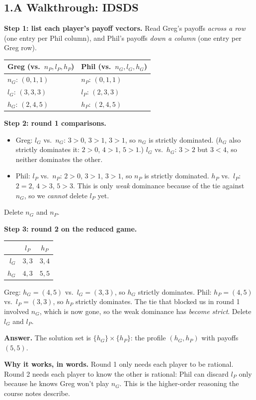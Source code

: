 \documentclass[11pt]{article}
\begin{document}
\subsection*{1.A Walkthrough: IDSDS}
\textbf{Step 1: list each player's payoff vectors.} Read Greg's payoffs \emph{across a row} (one entry per Phil column), and Phil's payoffs \emph{down a column} (one entry per Greg row).
\begin{center}
\begin{tabular}{l|l}
Greg (vs.\ $n_P,l_P,h_P$) & Phil (vs.\ $n_G,l_G,h_G$) \\ \hline
$n_G$: $(0,1,1)$ & $n_P$: $(0,1,1)$ \\
$l_G$: $(3,3,3)$ & $l_P$: $(2,3,3)$ \\
$h_G$: $(2,4,5)$ & $h_P$: $(2,4,5)$
\end{tabular}
\end{center}

\textbf{Step 2: round 1 comparisons.}
\begin{itemize}
\item Greg: $l_G$ vs.\ $n_G$: $3>0$, $3>1$, $3>1$, so $n_G$ is strictly dominated. ($h_G$ also strictly dominates it: $2>0$, $4>1$, $5>1$.) $l_G$ vs.\ $h_G$: $3>2$ but $3<4$, so neither dominates the other.
\item Phil: $l_P$ vs.\ $n_P$: $2>0$, $3>1$, $3>1$, so $n_P$ is strictly dominated. $h_P$ vs.\ $l_P$: $2=2$, $4>3$, $5>3$. This is only \emph{weak} dominance because of the tie against $n_G$, so we \emph{cannot} delete $l_P$ yet.
\end{itemize}
Delete $n_G$ and $n_P$.

\textbf{Step 3: round 2 on the reduced game.}
\begin{center}
\begin{tabular}{r|cc}
 & $l_P$ & $h_P$ \\ \hline
$l_G$ & $3,3$ & $3,4$ \\
$h_G$ & $4,3$ & $5,5$
\end{tabular}
\end{center}
Greg: $h_G=(4,5)$ vs.\ $l_G=(3,3)$, so $h_G$ strictly dominates. Phil: $h_P=(4,5)$ vs.\ $l_P=(3,3)$, so $h_P$ strictly dominates. The tie that blocked us in round 1 involved $n_G$, which is now gone, so the weak dominance has \emph{become strict}. Delete $l_G$ and $l_P$.

\textbf{Answer.} The solution set is $\{h_G\}\times\{h_P\}$: the profile $(h_G,h_P)$ with payoffs $(5,5)$.

\textbf{Why it works, in words.} Round 1 only needs each player to be rational. Round 2 needs each player to know the other is rational: Phil can discard $l_P$ only because he knows Greg won't play $n_G$. This is the higher-order reasoning the course notes describe.
\end{document}

